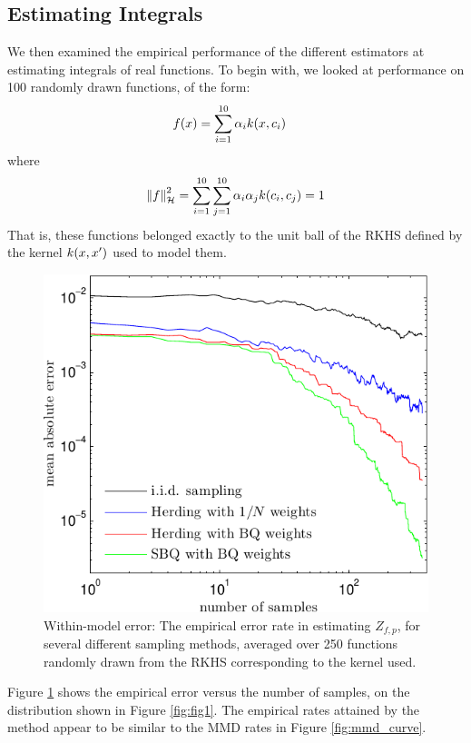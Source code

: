 \documentclass[]{article}
\begin{document}
\subsection{Estimating Integrals}


We then examined the empirical performance of the different estimators at estimating integrals of real functions.  To begin with, we looked at performance on 100 randomly drawn functions, of the form:
%
\begin{align}
f({x}) & = \sum_{i=1}^{10} \alpha_i k({x}, {c}_i)
\end{align}
%
where
\begin{align}
\left\|f\right\|_{\mathcal{H}}^2 = \sum_{i=1}^{10} \sum_{j=1}^{10} \alpha_i \alpha_j k({c}_i, {c}_j) = 1
\end{align}
%
That is, these functions belonged exactly to the unit ball of the RKHS defined by the kernel $k({x}, {x}')$ used to model them.
%
\begin{figure}
\includegraphics[width=\columnwidth]{figures/error_curve_rkhs_400_v4}
\caption{Within-model error: The empirical error rate in estimating $Z_{f,p}$, for several different sampling methods, averaged over 250 functions randomly drawn from the RKHS corresponding to the kernel used.}
\label{fig:error_curve}
\end{figure}
%
Figure \ref{fig:error_curve} shows the empirical error versus the number of samples, on the distribution shown in Figure \ref{fig:fig1}.  The empirical rates attained by the method appear to be similar to the MMD rates in Figure \ref{fig:mmd_curve}.
\end{document}
